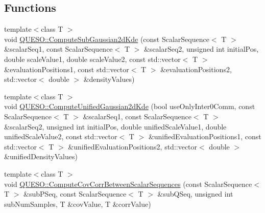 \subsection*{Functions}
\begin{DoxyCompactItemize}
\item 
{\footnotesize template$<$class T $>$ }\\void \hyperlink{namespace_q_u_e_s_o_af865210b84a63c53796aff42989c4af7}{Q\-U\-E\-S\-O\-::\-Compute\-Sub\-Gaussian2d\-Kde} (const Scalar\-Sequence$<$ T $>$ \&scalar\-Seq1, const Scalar\-Sequence$<$ T $>$ \&scalar\-Seq2, unsigned int initial\-Pos, double scale\-Value1, double scale\-Value2, const std\-::vector$<$ T $>$ \&evaluation\-Positions1, const std\-::vector$<$ T $>$ \&evaluation\-Positions2, std\-::vector$<$ double $>$ \&density\-Values)
\item 
{\footnotesize template$<$class T $>$ }\\void \hyperlink{namespace_q_u_e_s_o_af7a1e5f83b5acc46b51bc87eb3dc9b28}{Q\-U\-E\-S\-O\-::\-Compute\-Unified\-Gaussian2d\-Kde} (bool use\-Only\-Inter0\-Comm, const Scalar\-Sequence$<$ T $>$ \&scalar\-Seq1, const Scalar\-Sequence$<$ T $>$ \&scalar\-Seq2, unsigned int initial\-Pos, double unified\-Scale\-Value1, double unified\-Scale\-Value2, const std\-::vector$<$ T $>$ \&unified\-Evaluation\-Positions1, const std\-::vector$<$ T $>$ \&unified\-Evaluation\-Positions2, std\-::vector$<$ double $>$ \&unified\-Density\-Values)
\item 
{\footnotesize template$<$class T $>$ }\\void \hyperlink{namespace_q_u_e_s_o_add6823a7271447445f532bf5ce73e9b8}{Q\-U\-E\-S\-O\-::\-Compute\-Cov\-Corr\-Between\-Scalar\-Sequences} (const Scalar\-Sequence$<$ T $>$ \&sub\-P\-Seq, const Scalar\-Sequence$<$ T $>$ \&sub\-Q\-Seq, unsigned int sub\-Num\-Samples, T \&cov\-Value, T \&corr\-Value)
\end{DoxyCompactItemize}
